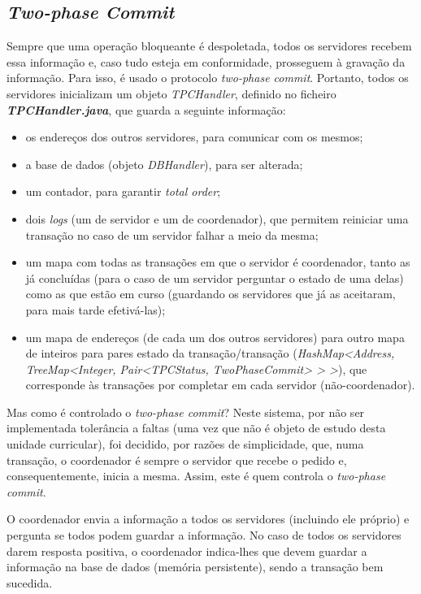 \documentclass[a4paper]{report}
\begin{document}
		\subsection{\textit{Two-phase Commit}}

		Sempre que uma operação bloqueante é despoletada, todos os servidores recebem essa informação e, caso tudo esteja em conformidade, prosseguem à gravação da informação.
		Para isso, é usado o protocolo \textit{two-phase commit}. Portanto, todos os servidores inicializam um objeto \textit{TPCHandler}, definido no ficheiro \textit{\textbf{TPCHandler.java}}, 
		que guarda a seguinte informação:
		\begin{itemize}
		\item os endereços dos outros servidores, para comunicar com os mesmos;
		\item a base de dados (objeto \textit{DBHandler}), para ser alterada;
		\item um contador, para garantir \textit{total order};
		\item dois \textit{logs} (um de servidor e um de coordenador), que permitem reiniciar uma transação no caso de um servidor falhar a meio da mesma;
		\item um mapa com todas as transações em que o servidor é coordenador, tanto as já concluídas (para o caso de um servidor perguntar o estado de uma delas) como as que estão em curso (guardando os servidores que já as aceitaram, para mais tarde efetivá-las);
		\item um mapa de endereços (de cada um dos outros servidores) para outro mapa de inteiros para pares estado da transação/transação 
		(\textit{HashMap<Address, TreeMap<Integer, Pair<TPCStatus, TwoPhaseCommit> > >}), que corresponde às transações por completar em cada servidor (não-coordenador).
		\end{itemize}
		
		Mas como é controlado o \textit{two-phase commit}?
		Neste sistema, por não ser implementada tolerância a faltas (uma vez que não é objeto de estudo desta unidade curricular), foi decidido, por razões de simplicidade, 
		que, numa transação, o coordenador é sempre o servidor que recebe o pedido e, consequentemente, inicia a mesma.
		Assim, este é quem controla o \textit{two-phase commit}.

		O coordenador envia a informação a todos os servidores (incluindo ele próprio) e pergunta se todos podem guardar a informação. 
		No caso de todos os servidores darem resposta positiva, o coordenador indica-lhes que devem guardar a informação na base de dados (memória persistente), sendo a transação bem sucedida.
\end{document}
